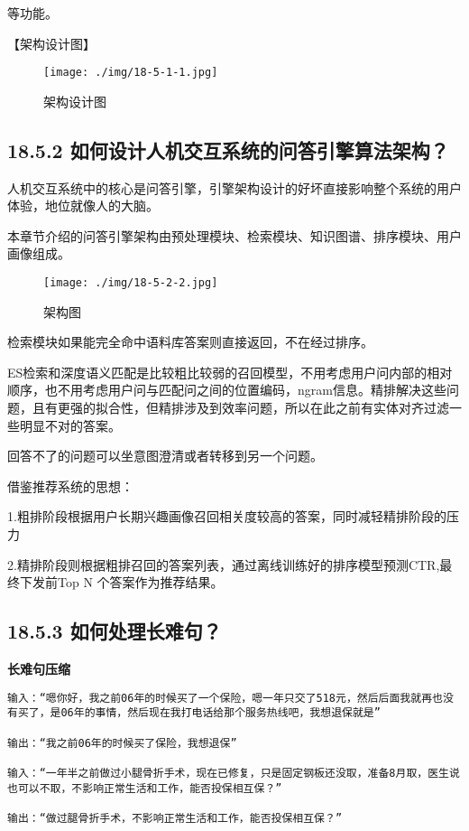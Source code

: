 等功能。

【架构设计图】

\begin{figure}
\centering
\texttt{[image: ./img/18-5-1-1.jpg]}
\caption{架构设计图}
\end{figure}

\subsection{18.5.2
如何设计人机交互系统的问答引擎算法架构？}\label{ux5982ux4f55ux8bbeux8ba1ux4ebaux673aux4ea4ux4e92ux7cfbux7edfux7684ux95eeux7b54ux5f15ux64ceux7b97ux6cd5ux67b6ux6784}

人机交互系统中的核心是问答引擎，引擎架构设计的好坏直接影响整个系统的用户体验，地位就像人的大脑。

本章节介绍的问答引擎架构由预处理模块、检索模块、知识图谱、排序模块、用户画像组成。

\begin{figure}
\centering
\texttt{[image: ./img/18-5-2-2.jpg]}
\caption{架构图}
\end{figure}

检索模块如果能完全命中语料库答案则直接返回，不在经过排序。

ES检索和深度语义匹配是比较粗比较弱的召回模型，不用考虑用户问内部的相对顺序，也不用考虑用户问与匹配问之间的位置编码，ngram信息。精排解决这些问题，且有更强的拟合性，但精排涉及到效率问题，所以在此之前有实体对齐过滤一些明显不对的答案。

回答不了的问题可以坐意图澄清或者转移到另一个问题。

借鉴推荐系统的思想：

1.粗排阶段根据用户长期兴趣画像召回相关度较高的答案，同时减轻精排阶段的压力

2.精排阶段则根据粗排召回的答案列表，通过离线训练好的排序模型预测CTR,最终下发前Top
N 个答案作为推荐结果。

\subsection{18.5.3
如何处理长难句？}\label{ux5982ux4f55ux5904ux7406ux957fux96beux53e5}

\textbf{长难句压缩}

\begin{verbatim}
输入：“嗯你好，我之前06年的时候买了一个保险，嗯一年只交了518元，然后后面我就再也没有买了，是06年的事情，然后现在我打电话给那个服务热线吧，我想退保就是”

输出：“我之前06年的时候买了保险，我想退保”

输入：“一年半之前做过小腿骨折手术，现在已修复，只是固定钢板还没取，准备8月取，医生说也可以不取，不影响正常生活和工作，能否投保相互保？”

输出：“做过腿骨折手术，不影响正常生活和工作，能否投保相互保？”
\end{verbatim}

